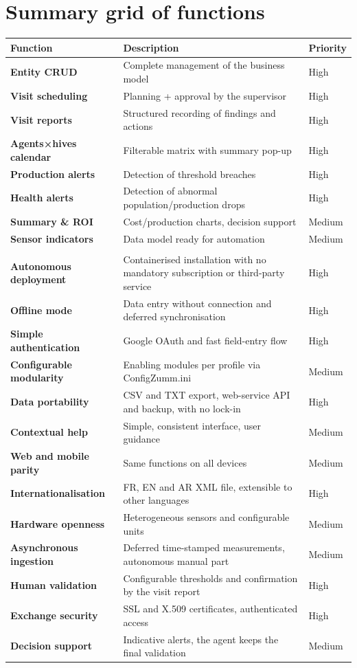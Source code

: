 \section{Summary grid of functions}
\begin{xltabular}{\textwidth}{>{\bfseries}p{3.4cm} X C{2.2cm}}
\toprule
\textbf{Function} & \textbf{Description} & \textbf{Priority} \\
\midrule
\endhead
Entity CRUD        & Complete management of the business model                & High \\
Visit scheduling   & Planning + approval by the supervisor                    & High \\
Visit reports      & Structured recording of findings and actions             & High \\
Agents×hives calendar & Filterable matrix with summary pop-up                 & High \\
Production alerts  & Detection of threshold breaches                          & High \\
Health alerts      & Detection of abnormal population/production drops         & High \\
Summary \& ROI     & Cost/production charts, decision support                 & Medium \\
Sensor indicators  & Data model ready for automation                          & Medium \\
\midrule
{} \\
\midrule
Autonomous deployment & Containerised installation with no mandatory subscription or third-party service & High \\
Offline mode & Data entry without connection and deferred synchronisation & High \\
Simple authentication & Google OAuth and fast field-entry flow & High \\
Configurable modularity & Enabling modules per profile via ConfigZumm.ini & Medium \\
Data portability & CSV and TXT export, web-service API and backup, with no lock-in & High \\
Contextual help & Simple, consistent interface, user guidance & Medium \\
Web and mobile parity & Same functions on all devices & Medium \\
Internationalisation & FR, EN and AR XML file, extensible to other languages & High \\
Hardware openness & Heterogeneous sensors and configurable units & Medium \\
Asynchronous ingestion & Deferred time-stamped measurements, autonomous manual part & Medium \\
Human validation & Configurable thresholds and confirmation by the visit report & High \\
Exchange security & SSL and X.509 certificates, authenticated access & High \\
Decision support & Indicative alerts, the agent keeps the final validation & Medium \\
\bottomrule
\end{xltabular}

